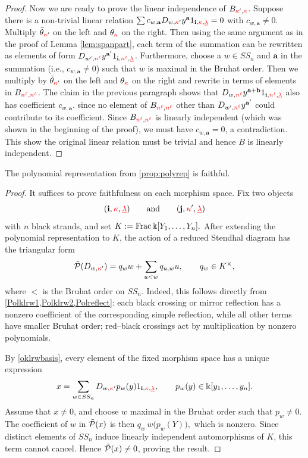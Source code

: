 \begin{proof}
 Now we are ready to prove the linear independence of $B_{{\color{red}\kappa}',{\color{red}\kappa}}$. Suppose
 there is a non-trivial linear relation $\sum c_{w,\mathbf{a}}D_{w,{\color{red}\kappa}'}y^{\mathbf{a}} 1_{\mathbf{i},{\color{red}\kappa},{{\color{red}\underline{\lambda}}}}=0$ with $c_{w,\mathbf a }\neq 0$.
 Multiply $\bar \theta_{{\color{red}\kappa}'}$ on the left and $\theta_{\color{red}\kappa}$ on the right. Then using the same argument as in the proof of  Lemma \ref{lem:spanpart}, each term of the summation can be rewritten as elements of form $D_{w',{\color{red}n^\ell}}y^{\mathbf a'} 1_{\mathbf{i},{\color{red}n^\ell},{{\color{red}\underline{\lambda}}}}$.  Furthermore, choose a $w\in SS_n$ and $\mathbf a$ in the summation  (i.e., $c_{w,\mathbf a}\neq 0$) such that $w$ is maximal in the Bruhat order. Then we multiply  by $\bar \theta_{{\color{red}\kappa}'}$ on the left and $\theta_{\color{red}\kappa}$ on the right and rewrite in  terms of elements in $B_{{\color{red}n^\ell},{\color{red}n^\ell}}$.  The claim in the previous paragraph shows that $D_{w,{\color{red}n^\ell}}y^{\mathbf a+\mathbf b}1_{\mathbf{i},{\color{red}n^\ell},{{\color{red}\underline{\lambda}}}} $ also has coefficient $c_{w,\mathbf a}$. since no element of  $B_{{\color{red}n^\ell},{\color{red}n^\ell}}$ other than  $D_{w',{\color{red}n^\ell}}y^{\mathbf a'} $ could contribute to its coefficient. Since $B_{{\color{red}n^\ell},{\color{red}n^\ell}}$ is linearly independent (which was shown in the beginning of the proof), we must have $c_{w,\mathbf a}=0$, a contradiction. This show the original linear relation must be trivial and hence $B$ is linearly independent.   
\end{proof}


\begin{corollary}
\label{cor:faithfulpolyrep}
The polynomial representation from \cref{prop:polyrep} is faithful.
\end{corollary}

\begin{proof}
It suffices to prove faithfulness on each morphism space. Fix two objects
\[
(\mathbf{i},{\color{red}\kappa},{{\color{red}\underline{\lambda}}})
\qquad\text{and}\qquad
(\mathbf{j},{\color{red}\kappa}',{{\color{red}\underline{\lambda}}})
\]
with \(n\) black strands, and set
\(
K:=\operatorname{Frac}\Bbbk[Y_1,\ldots,Y_n].
\)
After extending the polynomial representation to \(K\), the action of a
reduced Stendhal diagram has the triangular form
\[
\tilde{\mathcal{P}}(D_{w,{\color{red}\kappa}'})
=
q_w w+\sum_{u<w}q_{u,w}u,
\qquad q_w\in K^\times,
\]
where \(<\) is the Bruhat order on \(SS_n\). Indeed, this follows directly
from \cref{Polklrw1,Polklrw2,Polreflect}: each black crossing or mirror
reflection has a nonzero coefficient of the corresponding simple
reflection, while all other terms have smaller Bruhat order; red--black
crossings act by multiplication by nonzero polynomials.

By \cref{oklrwbasis}, every element of the fixed morphism space has a
unique expression
\[
x=\sum_{w\in SS_n}
D_{w,{\color{red}\kappa}'}p_w(y)
1_{\mathbf{i},{\color{red}\kappa},{{\color{red}\underline{\lambda}}}},
\qquad
p_w(y)\in\Bbbk[y_1,\ldots,y_n].
\]
Assume that \(x\neq0\), and choose \(w\) maximal in the Bruhat order such
that \(p_w\neq0\). The coefficient of \(w\) in \(\tilde{\mathcal{P}}(x)\) is then
\(
q_w\,w\bigl(p_w(Y)\bigr),
\)
which is nonzero. Since distinct elements of \(SS_n\) induce linearly
independent automorphisms of \(K\), this term cannot cancel. Hence
\(\tilde{\mathcal{P}}(x)\neq0\), proving the result.
\end{proof}



